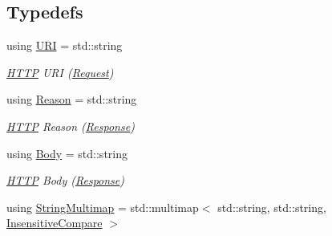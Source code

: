 \subsection*{Typedefs}
\begin{DoxyCompactItemize}
\item 
using \mbox{\hyperlink{namespaceo_z_1_1_h_t_t_p_a6d47156e2eac27750983fc1b54bd2ff8}{U\+RI}} = std\+::string
\begin{DoxyCompactList}\small\item\em \mbox{\hyperlink{namespaceo_z_1_1_h_t_t_p}{H\+T\+TP}} U\+RI (\mbox{\hyperlink{classo_z_1_1_h_t_t_p_1_1_request}{Request}}) \end{DoxyCompactList}\item 
using \mbox{\hyperlink{namespaceo_z_1_1_h_t_t_p_afcd8b91e5e8a7b6df0a7b3b298ec3965}{Reason}} = std\+::string
\begin{DoxyCompactList}\small\item\em \mbox{\hyperlink{namespaceo_z_1_1_h_t_t_p}{H\+T\+TP}} Reason (\mbox{\hyperlink{classo_z_1_1_h_t_t_p_1_1_response}{Response}}) \end{DoxyCompactList}\item 
using \mbox{\hyperlink{namespaceo_z_1_1_h_t_t_p_a270c38b9f9b6228ce430fda6d5b150d6}{Body}} = std\+::string
\begin{DoxyCompactList}\small\item\em \mbox{\hyperlink{namespaceo_z_1_1_h_t_t_p}{H\+T\+TP}} Body (\mbox{\hyperlink{classo_z_1_1_h_t_t_p_1_1_response}{Response}}) \end{DoxyCompactList}\item 
using \mbox{\hyperlink{namespaceo_z_1_1_h_t_t_p_a339aac279d709cfa16148ad073500fc1}{String\+Multimap}} = std\+::multimap$<$ std\+::string, std\+::string, \mbox{\hyperlink{structo_z_1_1_h_t_t_p_1_1_insensitive_compare}{Insensitive\+Compare}} $>$
\end{DoxyCompactItemize}

